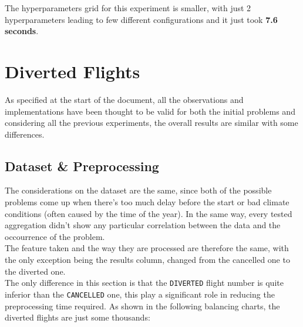 \documentclass[
	letterpaper, %
	10pt, %
]{class}
\begin{document}
The hyperparameters grid for this experiment is smaller, with just 2 hyperparameters leading to few different configurations and it just took \textbf{7.6 seconds}.

\section{Diverted Flights}

As specified at the start of the document, all the observations and implementations have been thought to be valid for both the initial problems and considering all the previous experiments, the overall results are similar with some differences.\\

\subsection{Dataset \& Preprocessing}
The considerations on the dataset are the same, since both of the possible problems come up when there's too much delay before the start or bad climate conditions (often caused by the time of the year). In the same way, every tested aggregation didn't show any particular correlation between the data and the occourrence of the problem.\\
The feature taken and the way they are processed are therefore the same, with the only exception being the results column, changed from the cancelled one to the diverted one.\\

The only difference in this section is that the \texttt{DIVERTED} flight number is quite inferior than the \texttt{CANCELLED} one, this play a significant role in reducing the preprocessing time required.
As shown in the following balancing charts, the diverted flights are just some thousands:\\
\end{document}
